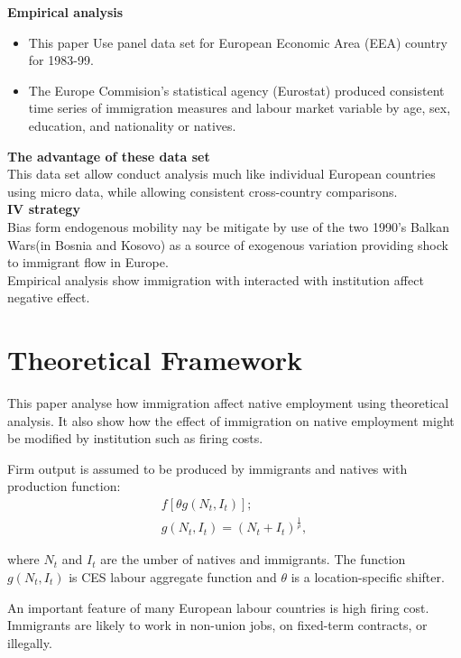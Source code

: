 \documentclass[../root]{subfiles}
\begin{document}
     {\bf Empirical analysis}
     \begin{itemize}
         \item This paper Use panel data set for European Economic Area (EEA) country for 1983-99.
         \item The Europe Commision's statistical agency (Eurostat) produced consistent time series of immigration measures and labour market variable by age, sex, education, and nationality or natives.
     \end{itemize}
     
     {\bf The advantage of these data set} \\
     This data set allow conduct analysis much like individual European countries using micro data, while allowing consistent cross-country comparisons.  \\
     
     {\bf IV strategy} \\
     Bias form endogenous mobility nay be mitigate by use of the two 1990's Balkan Wars(in Bosnia and Kosovo) as a source of exogenous variation providing shock to immigrant flow in Europe. \\
     
     Empirical analysis show immigration with interacted with institution affect negative effect.
    
    
    \section{Theoretical Framework}
    This paper analyse how immigration affect native employment using theoretical analysis.  It also show how the effect of immigration on native employment might be modified by institution such as firing costs.
    
    Firm output is assumed to be produced by immigrants and natives with production function:
    \begin{align*}
        f[\theta g(N_t, I_t)]; \\
        g(N_t, I_t)=(N_t+I_t)^{\frac{1}{\rho}},
    \end{align*}

    where $N_t$ and $I_t$ are the umber of natives and immigrants. The function $g(N_t, I_t)$ is CES labour aggregate function and $\theta$ is a location-specific shifter.

    An important feature of many European labour countries is high firing cost.
    Immigrants are likely to work in non-union jobs, on fixed-term contracts, or illegally.
\end{document}
